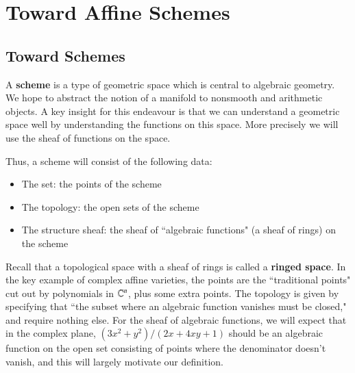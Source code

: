 %
%
%
\chapter{Toward Affine Schemes}
\label{AffSchem} %

\section{Toward Schemes}

A \textbf{scheme} is a type of geometric space which is central to algebraic geometry. We hope to abstract the notion of a manifold to nonsmooth and arithmetic objects. A key insight for this endeavour is that we can understand a geometric space well by understanding the functions on this space. More precisely we will use the sheaf of functions on the space.

Thus, a scheme will consist of the following data: \begin{itemize}
    \item The set: the points of the scheme
    \item The topology: the open sets of the scheme
    \item The structure sheaf: the sheaf of ``algebraic functions" (a sheaf of rings) on the scheme
\end{itemize}

Recall that a topological space with a sheaf of rings is called a \textbf{ringed space}. In the key example of complex affine varieties, the points are the ``traditional points" cut out by polynomials in $\mathbb C^n$, plus some extra points. The topology is given by specifying that ``the subset where an algebraic function vanishes must be closed," and require nothing else. For the sheaf of algebraic functions, we will expect that in the complex plane, $(3x^2+y^2)/(2x+4xy+1)$ should be an algebraic function on the open set consisting of points where the denominator doesn't vanish, and this will largely motivate our definition. 

